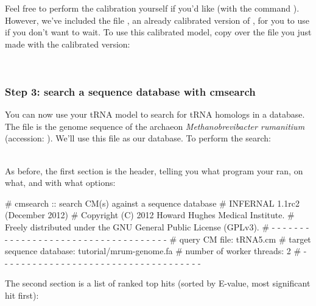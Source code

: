 Feel free to perform the calibration yourself if you'd like (with the
command ). However, we've included the file
, an already calibrated version of ,
for you to use if you don't want to wait. To use this calibrated
model, copy over the  file you just made with the
calibrated version:
 
\\
 
\subsubsection{Step 3: search a sequence database with cmsearch}

You can now use your tRNA model to search for tRNA homologs in a
database. The file  is the genome sequence of the
archaeon \emph{Methanobrevibacter rumanitium} (accession:
). We'll use this file as our database. To perform
the search:

\\

As before, the first section is the header, telling you what program
your ran, on what, and with what options:

\begin{sreoutput}
# cmsearch :: search CM(s) against a sequence database
# INFERNAL 1.1rc2 (December 2012)
# Copyright (C) 2012 Howard Hughes Medical Institute.
# Freely distributed under the GNU General Public License (GPLv3).
# - - - - - - - - - - - - - - - - - - - - - - - - - - - - - - - - - - - -
# query CM file:                         tRNA5.cm
# target sequence database:              tutorial/mrum-genome.fa
# number of worker threads:              2
# - - - - - - - - - - - - - - - - - - - - - - - - - - - - - - - - - - - -
\end{sreoutput}

The second section is a list of ranked top hits (sorted by E-value,
most significant hit first):

